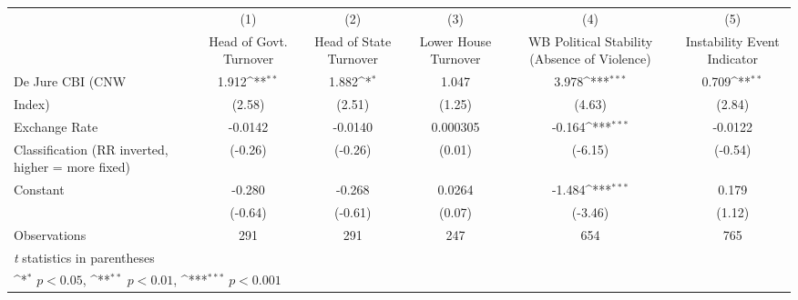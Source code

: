 {
\def\sym#1{\ifmmode^{#1}\else\(^{#1}\)\fi}
\begin{tabular}{l*{5}{c}}
\hline\hline
                    &\multicolumn{1}{c}{(1)}&\multicolumn{1}{c}{(2)}&\multicolumn{1}{c}{(3)}&\multicolumn{1}{c}{(4)}&\multicolumn{1}{c}{(5)}\\
                    &\multicolumn{1}{c}{Head of Govt. Turnover}&\multicolumn{1}{c}{Head of State Turnover}&\multicolumn{1}{c}{Lower House Turnover}&\multicolumn{1}{c}{WB Political Stability (Absence of Violence)}&\multicolumn{1}{c}{Instability Event Indicator}\\
\hline
De Jure CBI (CNW    &       1.912\sym{**} &       1.882\sym{*}  &       1.047         &       3.978\sym{***}&       0.709\sym{**} \\
Index)              &      (2.58)         &      (2.51)         &      (1.25)         &      (4.63)         &      (2.84)         \\
[1em]
Exchange Rate       &     -0.0142         &     -0.0140         &    0.000305         &      -0.164\sym{***}&     -0.0122         \\
Classification (RR inverted, higher = more fixed)&     (-0.26)         &     (-0.26)         &      (0.01)         &     (-6.15)         &     (-0.54)         \\
[1em]
Constant            &      -0.280         &      -0.268         &      0.0264         &      -1.484\sym{***}&       0.179         \\
                    &     (-0.64)         &     (-0.61)         &      (0.07)         &     (-3.46)         &      (1.12)         \\
\hline
Observations        &         291         &         291         &         247         &         654         &         765         \\
\hline\hline
\multicolumn{6}{l}{\footnotesize \textit{t} statistics in parentheses}\\
\multicolumn{6}{l}{\footnotesize \sym{*} \(p<0.05\), \sym{**} \(p<0.01\), \sym{***} \(p<0.001\)}\\
\end{tabular}
}
